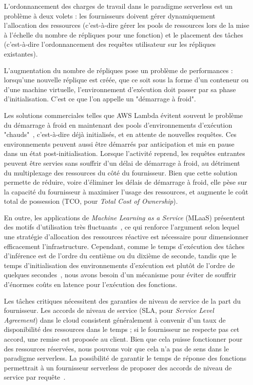 L'ordonnancement des charges de travail dans le paradigme serverless est un problème à deux volets : les fournisseurs doivent gérer dynamiquement l'allocation des ressources (c'est-à-dire gérer les pools de ressources lors de la mise à l'échelle du nombre de répliques pour une fonction) et le placement des tâches (c'est-à-dire l'ordonnancement des requêtes utilisateur sur les répliques existantes).

L'augmentation du nombre de répliques pose un problème de performances : lorsqu'une nouvelle réplique est créée, que ce soit sous la forme d'un conteneur ou d'une machine virtuelle, l'environnement d'exécution doit passer par sa phase d'initialisation. C'est ce que l'on appelle un "démarrage à froid".

Les solutions commerciales telles que AWS Lambda évitent souvent le problème du démarrage à froid en maintenant des pools d'environnements d'exécution "chauds"~\cite{vahidiniaColdStartServerless2020}, c'est-à-dire déjà initialisés, et en attente de nouvelles requêtes. Ces environnements peuvent aussi être démarrés par anticipation et mis en pause dans un état post-initialisation. Lorsque l'activité reprend, les requêtes entrantes peuvent être servies sans souffrir d'un délai de démarrage à froid, au détriment du multiplexage des ressources du côté du fournisseur. Bien que cette solution permette de réduire, voire d'éliminer les délais de démarrage à froid, elle pèse sur la capacité du fournisseur à maximiser l'usage des ressources, et augmente le coût total de possession (TCO, pour \textit{Total Cost of Ownership}).

En outre, les applications de \textit{Machine Learning as a Service} (MLaaS) présentent des motifs d'utilisation très fluctuants~\cite{gujaratiSwayamDistributedAutoscaling2017}, ce qui renforce l'argument selon lequel une stratégie d'allocation des ressources réactive est nécessaire pour dimensionner efficacement l'infrastructure. Cependant, comme le temps d'exécution des tâches d'inférence est de l'ordre du centième ou du dixième de seconde, tandis que le temps d'initialisation des environnements d'exécution est plutôt de l'ordre de quelques secondes~\cite{mancoMyVMLighter2017}, nous avons besoin d'un mécanisme pour éviter de souffrir d'énormes coûts en latence pour l'exécution des fonctions.

Les tâches critiques nécessitent des garanties de niveau de service de la part du fournisseur. Les accords de niveau de service (SLA, pour \textit{Service Level Agreement}) dans le cloud consistent généralement à convenir d'un taux de disponibilité des ressources dans le temps ; si le fournisseur ne respecte pas cet accord, une remise est proposée au client. Bien que cela puisse fonctionner pour des ressources réservées, nous pouvons voir que cela n'a pas de sens dans le paradigme serverless. La possibilité de garantir le temps de réponse des fonctions permettrait à un fournisseur serverless de proposer des accords de niveau de service par requête~\cite{zhangMArkExploitingCloud}.

